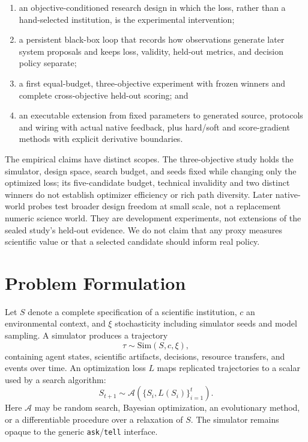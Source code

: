 \documentclass{article}
\newcommand{\code}[1]{\texttt{#1}}
\begin{document}
\begin{enumerate}[leftmargin=*,nosep]
    \item an objective-conditioned research design in which the loss, rather than a hand-selected institution, is the experimental intervention;
    \item a persistent black-box loop that records how observations generate later system proposals and keeps loss, validity, held-out metrics, and decision policy separate;
    \item a first equal-budget, three-objective experiment with frozen winners and complete cross-objective held-out scoring; and
    \item an executable extension from fixed parameters to generated source,
    protocols and wiring with actual native feedback, plus hard/soft and
    score-gradient methods with explicit derivative boundaries.
\end{enumerate}

The empirical claims have distinct scopes. The three-objective study holds the simulator, design space, search budget, and seeds fixed while changing only the optimized loss; its five-candidate budget, technical invalidity and two distinct winners do not establish optimizer efficiency or rich path diversity. Later native-world probes test broader design freedom at small scale, not a replacement numeric science world. They are development experiments, not extensions of the sealed study's held-out evidence. We do not claim that any proxy measures scientific value or that a selected candidate should inform real policy.

\section{Problem Formulation}

Let $S$ denote a complete specification of a scientific institution, $c$ an environmental context, and $\xi$ stochasticity including simulator seeds and model sampling. A simulator produces a trajectory
\begin{equation}
    \tau \sim \mathrm{Sim}(S,c,\xi),
\end{equation}
containing agent states, scientific artifacts, decisions, resource transfers, and events over time. An optimization loss $L$ maps replicated trajectories to a scalar used by a search algorithm:
\begin{equation}
    S_{t+1} \sim \mathcal{A}\!\left(\{S_i,L(S_i)\}_{i=1}^{t}\right).
\end{equation}
Here $\mathcal{A}$ may be random search, Bayesian optimization, an evolutionary method, or a differentiable procedure over a relaxation of $S$. The simulator remains opaque to the generic \code{ask}/\code{tell} interface.
\end{document}
